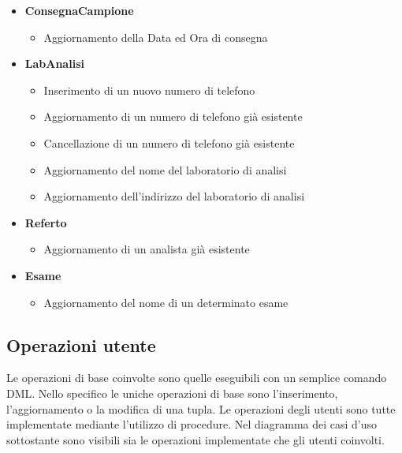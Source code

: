 \documentclass[12pt]{report}
\begin{document}
\begin{itemize}
	\item \textbf{ConsegnaCampione}
	\begin{itemize}
	\item Aggiornamento della Data ed Ora di consegna
	\end{itemize}
	
\item \textbf{LabAnalisi}
	\begin{itemize}
	\item Inserimento di un nuovo numero di telefono
	\item Aggiornamento di un numero di telefono già esistente
	\item Cancellazione di un numero di telefono già esistente
	\item Aggiornamento del nome del laboratorio di analisi
	\item Aggiornamento dell'indirizzo del laboratorio di analisi
	\end{itemize}	

\item \textbf{Referto}
	\begin{itemize}
	\item Aggiornamento di un analista già esistente
	
	\end{itemize}
\item \textbf{Esame}
	\begin{itemize}
	\item Aggiornamento del nome di un determinato esame
	\end{itemize}	
\end{itemize}


\newpage

\subsection{Operazioni utente}
Le operazioni di base coinvolte sono quelle eseguibili con un semplice comando DML. Nello specifico le uniche operazioni di base sono l’inserimento, l’aggiornamento o la modifica di una tupla. Le operazioni degli utenti sono tutte implementate mediante l'utilizzo di procedure. Nel diagramma dei casi d’uso sottostante sono visibili sia le operazioni implementate
che gli utenti coinvolti.
\end{document}
